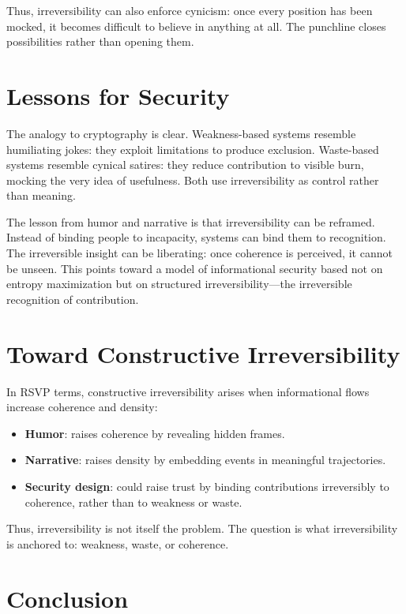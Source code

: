 \documentclass[openany]{book}
\begin{document}
Thus, irreversibility can also enforce cynicism: once every position has been mocked, it becomes difficult to believe in anything at all. The punchline closes possibilities rather than opening them.

\section{Lessons for Security}

The analogy to cryptography is clear. Weakness-based systems resemble humiliating jokes: they exploit limitations to produce exclusion. Waste-based systems resemble cynical satires: they reduce contribution to visible burn, mocking the very idea of usefulness. Both use irreversibility as control rather than meaning.

The lesson from humor and narrative is that irreversibility can be reframed. Instead of binding people to incapacity, systems can bind them to recognition. The irreversible insight can be liberating: once coherence is perceived, it cannot be unseen. This points toward a model of informational security based not on entropy maximization but on structured irreversibility---the irreversible recognition of contribution.

\section{Toward Constructive Irreversibility}

In RSVP terms, constructive irreversibility arises when informational flows increase coherence and density:

\begin{itemize}
    \item \textbf{Humor}: raises coherence by revealing hidden frames.
    \item \textbf{Narrative}: raises density by embedding events in meaningful trajectories.
    \item \textbf{Security design}: could raise trust by binding contributions irreversibly to coherence, rather than to weakness or waste.
\end{itemize}

Thus, irreversibility is not itself the problem. The question is what irreversibility is anchored to: weakness, waste, or coherence.

\section{Conclusion}
\end{document}
